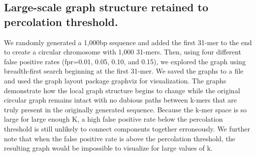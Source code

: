 \documentclass[12pt]{article} \usepackage{simplemargins}
\begin{document}
\subsection{Large-scale graph structure retained to percolation threshold.} We
randomly generated a 1,000bp sequence and added the first 31-mer to
the end to create a circular chromosome with 1,000 31-mers. Then,
using four different false positive rates (fpr=0.01, 0.05, 0.10, and
0.15), we explored the graph using breadth-first search beginning at
the first 31-mer. We saved the graphs to a file and used the graph
layout package graphviz for visualization. The graphs demonstrate how
the local graph structure begins to change while the original circular
graph remains intact with no dubious paths between k-mers that are
truly present in the originally generated sequence. Because the k-mer
space is so large for large enough K, a high false positive rate below
the percolation threshold is still unlikely to connect components
together erroneously. We further note that when the false positive
rate is above the percolation threshold, the resulting graph would be
impossible to visualize for large values of k.
\end{document}
